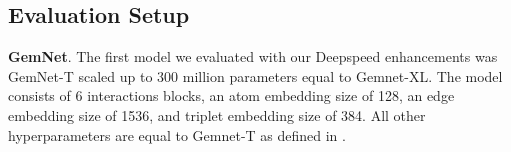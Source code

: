 \subsection{Evaluation Setup}

\textbf{GemNet}. The first model we evaluated with our Deepspeed enhancements was GemNet-T 
scaled up to 300 million parameters equal to Gemnet-XL\cite*{https://doi.org/10.48550/arxiv.2203.09697}.
The model consists of 6 interactions blocks, an atom embedding size of 128, an edge embedding size of 1536, 
and triplet embedding size of 384. All other hyperparameters are equal to Gemnet-T as defined in 
\cite*{https://doi.org/10.48550/arxiv.2106.08903}.